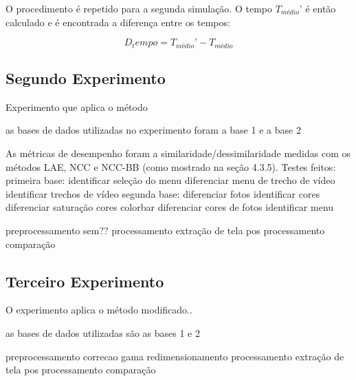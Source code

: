 O procedimento é repetido para a segunda simulação. O tempo $T_{médio}’$ é então calculado e é encontrada a diferença entre os tempos:

\begin{equation}
D_tempo = T_{médio}’ - T_{médio}
\end{equation}


\subsection{Segundo Experimento}


Experimento que aplica o método 


as bases de dados utilizadas no experimento foram a base 1 e a base 2


As métricas de desempenho foram a similaridade/dessimilaridade medidas com os métodos LAE, NCC e NCC-BB (como mostrado na seção 4.3.5). Testes feitos:
primeira base: 
identificar seleção do menu
diferenciar menu de trecho de vídeo
identificar trechos de vídeo
segunda base:
diferenciar fotos
identificar cores
diferenciar saturação
cores
colorbar
diferenciar cores de fotos
identificar menu



preprocessamento
sem??
processamento
extração de tela
pos processamento
comparação



\subsection{Terceiro Experimento}


O experimento aplica o método modificado..


as bases de dados utilizadas são as bases 1 e 2





preprocessamento
correcao gama
redimensionamento
processamento
extração de tela
pos processamento
comparação



